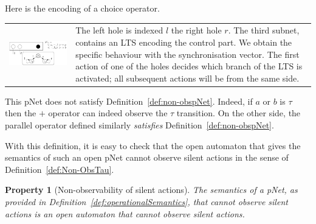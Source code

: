 \documentclass{elsarticle}
\newcommand{\TODO}[1]{\textcolor{red}{\textbf{[TODO:#1]}}}
\newtheorem{property}{Property}
\begin{document}
\begin{example}\label{ex:CCSplus}
Here is the encoding of a choice operator.\\[1.5ex]
\begin{tabular}{cp{.53\linewidth}}
 \begin{minipage}{.4\linewidth}
 \includegraphics[width=1.04\linewidth]{XFIG/Choice.pdf}\vspace{-18ex}
\end{minipage} 
&
The left hole is
  indexed $l$ the right hole $r$. The third subnet, contains an LTS encoding
  the control part. We obtain the specific behaviour with the 
  synchronisation vector. The first action  of one of
  the holes decides which branch of the LTS is activated;
   all subsequent actions will be from the same side. 
\\
\end{tabular}

This pNet does not satisfy Definition~\ref{def:non-obspNet}. Indeed, if $a$ or $b$ is $\tau$ then the $+$ operator can indeed observe the $\tau$ transition.
On the other side, the parallel operator defined similarly \emph{satisfies} Definition~\ref{def:non-obspNet}.



\end{example}

With this definition, it is easy to check that the open automaton that gives the semantics of such an open pNet cannot observe silent actions in the sense of Definition~\ref{def:Non-ObsTau}.

\begin{property}[Non-observability of silent actions]
The  semantics of a pNet, as provided in Definition~\ref{def:operationalSemantics}, that cannot observe silent actions is an open automaton that  cannot observe silent actions.
\end{property}

\end{document}
